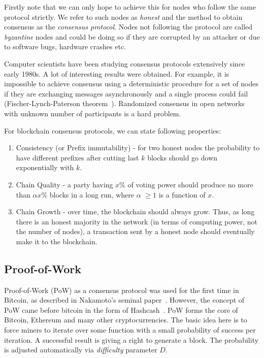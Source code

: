 \documentclass[]{report}   %
\begin{document}
Firstly note that we can only hope to achieve this for nodes who follow the same protocol strictly. We refer to such nodes as \textit{honest} and the method to obtain consensus as the \textit{consensus protocol}. Nodes not following the protocol are called \textit{byzantine} nodes and could be doing so if they are corrupted by an attacker or due to software bugs, hardware crashes etc. 

Computer scientists have been studying consensus protocols extensively since early 1980s. A lot of interesting results were obtained. For example, it is impossible to achieve consensus using a deterministic procedure for a set of nodes if they are exchanging messages asynchronously and a single process could fail (Fischer-Lynch-Paterson theorem~\cite{fischer1985impossibility}). 
Randomized consensus in open networks with unknown number of participants is a hard problem. %


For blockchain consensus protocols, we can state following properties:

\begin{enumerate}
\item{Consistency (or Prefix immutability)} - for two honest nodes the probability to have different prefixes after cutting last \(k\) blocks should go down exponentially with \(k\).
\item{Chain Quality} - a party having \(x\%\) of voting power should produce no more than \(\alpha x \%\) blocks in a long run, where \(\alpha\) $\geq 1$ is a function of \(x\).
\item{Chain Growth} - over time, the blockchain should always grow. Thus, as long there is an honest majority in the network (in terms of computing power, not the number of nodes), a transaction sent by a honest node should eventually make it to the blockchain.
\end{enumerate}


\subsection{Proof-of-Work}

Proof-of-Work (PoW) as a consensus protocol was used for the first time in Bitcoin, as described in Nakamoto's seminal paper~\cite{Nakamoto2008}.
However, the concept of PoW came before bitcoin in the form of Hashcash~\cite{back2002hashcash}.
PoW forms the core of Bitcoin, Ethereum and many other cryptocurrencies. The basic idea here is to force miners to iterate over some function with a small probability of success per iteration. A successful result is giving a right to generate a block. The probability is adjusted automatically via \textit{difficulty} parameter \(D\). 
\end{document}
